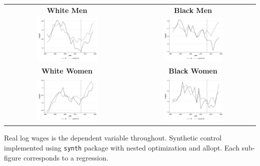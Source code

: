 \documentclass[11pt]{article}
\begin{document}
{\pagebreak
\begin{landscape}
\begin{table}[ht!]
    \centering
    \label{fig:synth_mi}
    \begin{tabular}{c c}
          \textbf{White Men} & \textbf{Black Men} \\    
          \includegraphics[width = 0.5\textwidth, keepaspectratio]{figures/fin_synth_wm_mi.png} & \includegraphics[width = 0.5\textwidth, keepaspectratio]{figures/fin_synth_bm_mi.png} \\
          \textbf{White Women} & \textbf{Black Women} \\
          \includegraphics[width = 0.5\textwidth, keepaspectratio]{figures/fin_synth_wf_mi.png} & \includegraphics[width = 0.5\textwidth, keepaspectratio]{figures/fin_synth_bf_mi.png}
    \end{tabular}
\end{table}
\footnotesize{Real log wages is the dependent variable throughout. Synthetic control implemented using \texttt{synth} package with nested optimization and allopt. Each sub-figure corresponds to a regression.}
\end{landscape}

}
\end{document}
